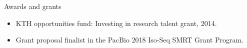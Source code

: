 \documentclass{resume} %
\begin{document}
\begin{rSection}{Awards and grants}
\begin{itemize}
\item KTH opportunities fund: Investing in research talent grant, 2014.
\item Grant proposal finalist in the PacBio 2018 Iso-Seq SMRT Grant Program.
\end{itemize}

\end{rSection}










\end{document}
